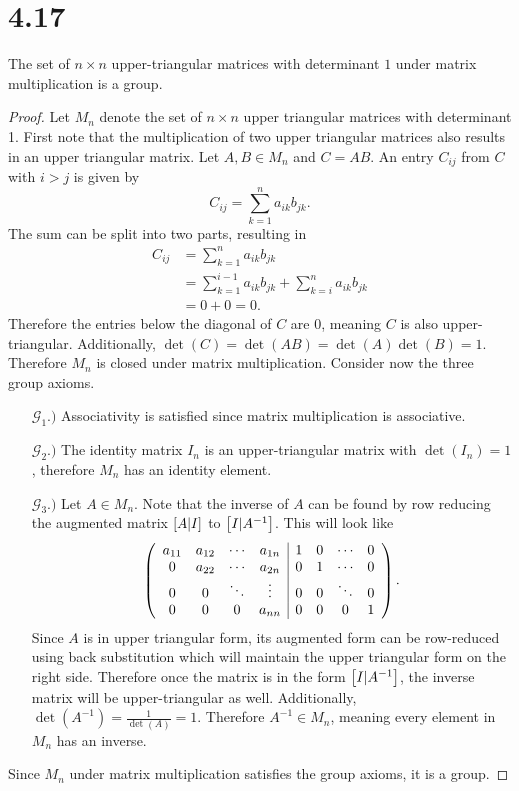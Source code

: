 \documentclass[12pt]{extarticle}
\begin{document}
\section*{4.17}
The set of $n\times n$ upper-triangular matrices with determinant $1$ under matrix multiplication is a group.

\begin{proof}
	Let $M_n$ denote the set of $n \times n$ upper triangular matrices with determinant 1. First note that the multiplication of two upper triangular matrices also results in an upper triangular matrix. Let $A, B \in M_n$ and $C = AB$. An entry $C_{ij}$ from $C$ with $i > j$ is given by
	\[
		C_{ij} = \sum_{k=1}^n a_{ik} b_{jk}
	.\]
	The sum can be split into two parts, resulting in
	\begin{align*}
		C_{ij} &= \sum_{k=1}^n a_{ik} b_{jk} \\
					 &= \sum_{k=1}^{i-1} a_{ik} b_{jk} + \sum_{k=i}^{n} a_{ik} b_{jk} \\
					 &= 0 + 0 = 0
	.\end{align*}
	Therefore the entries below the diagonal of $C$ are $0$, meaning $C$ is also upper-triangular. Additionally, $\det(C) = \det(AB) = \det(A)\det(B) = 1$. Therefore $M_n$ is closed under matrix multiplication. Consider now the three group axioms.
	\begin{enumerate}
		\item[$\mathcal{G}_1.)$]
		Associativity is satisfied since matrix multiplication is associative.
		\item[$\mathcal{G}_2.)$]
		The identity matrix $I_n$ is an upper-triangular matrix with $\det(I_n) = 1$, therefore $M_n$ has an identity element.
		\item[$\mathcal{G}_3.)$]
			Let $A \in M_n$. Note that the inverse of $A$ can be found by row reducing the augmented matrix $\qty[A | I]$ to $\qty[I | A^{-1} ]$. This will look like
			\[
				\left( 
				\begin{array}{cccc | cccc}
					a_{11} & a_{12} & \cdots & a_{1n} & 1 & 0 & \cdots & 0 \\
					0 & a_{22} & \cdots & a_{2n} & 0 & 1 & \cdots & 0 \\
					0 & 0 & \ddots & \vdots & 0 & 0 & \ddots & 0 \\
					0 & 0 & 0 & a_{nn} & 0 & 0 & 0 & 1 \\
				\end{array}
				\right)
			.\]
			Since $A$ is in upper triangular form, its augmented form can be row-reduced using back substitution which will maintain the upper triangular form on the right side. Therefore once the matrix is in the form $\qty[I | A^{-1}]$, the inverse matrix will be upper-triangular as well. Additionally, $\det(A^{-1}) = \frac{1}{\det(A)} = 1$. Therefore $A^{-1} \in M_n$, meaning every element in $M_n$ has an inverse.
	\end{enumerate}
	Since $M_n$ under matrix multiplication satisfies the group axioms, it is a group.
\end{proof}
\end{document}
